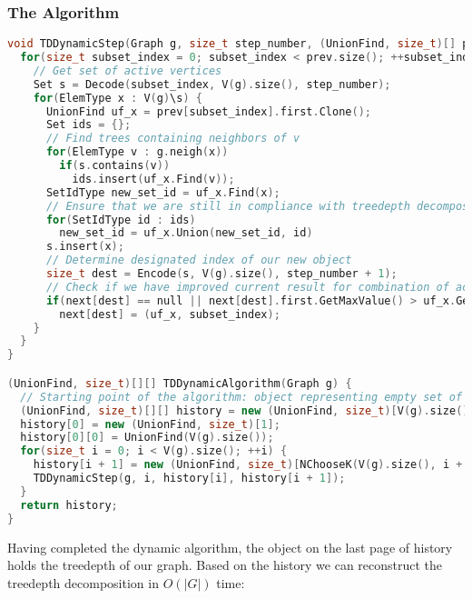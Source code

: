 \subsubsection{The Algorithm}
\begin{lstlisting}[language=C++]
void TDDynamicStep(Graph g, size_t step_number, (UnionFind, size_t)[] prev, (UnionFind, size_t)[] next) {
  for(size_t subset_index = 0; subset_index < prev.size(); ++subset_index) {
    // Get set of active vertices
    Set s = Decode(subset_index, V(g).size(), step_number);
    for(ElemType x : V(g)\s) {
      UnionFind uf_x = prev[subset_index].first.Clone();
      Set ids = {};
      // Find trees containing neighbors of v
      for(ElemType v : g.neigh(x))
        if(s.contains(v))
          ids.insert(uf_x.Find(v));
      SetIdType new_set_id = uf_x.Find(x);
      // Ensure that we are still in compliance with treedepth decomposition definition when adding x to active vertices
      for(SetIdType id : ids)
        new_set_id = uf_x.Union(new_set_id, id)
      s.insert(x);
      // Determine designated index of our new object
      size_t dest = Encode(s, V(g).size(), step_number + 1);
      // Check if we have improved current result for combination of active vertices represented by s
      if(next[dest] == null || next[dest].first.GetMaxValue() > uf_x.GetMaxValue())
        next[dest] = (uf_x, subset_index);
    }
  }
}

(UnionFind, size_t)[][] TDDynamicAlgorithm(Graph g) {
  // Starting point of the algorithm: object representing empty set of active vertices
  (UnionFind, size_t)[][] history = new (UnionFind, size_t)[V(g).size()][];
  history[0] = new (UnionFind, size_t)[1];
  history[0][0] = UnionFind(V(g).size());
  for(size_t i = 0; i < V(g).size(); ++i) {
    history[i + 1] = new (UnionFind, size_t)[NChooseK(V(g).size(), i + 1)];
    TDDynamicStep(g, i, history[i], history[i + 1]);
  }
  return history;
}
\end{lstlisting}
Having completed the dynamic algorithm, the object on the last page of history holds the treedepth of our graph. Based on the history we can reconstruct the treedepth decomposition in $O(|G|)$ time:
